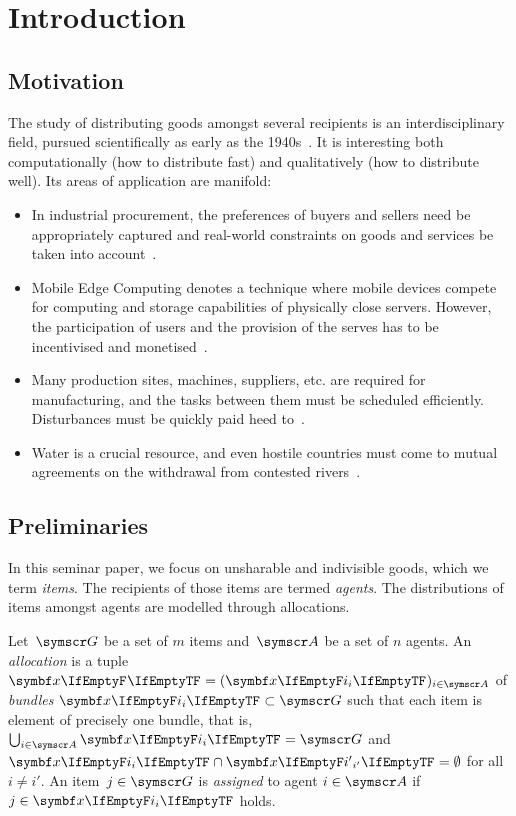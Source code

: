 \section{Introduction}
\label{sec:intro}

\subsection{Motivation}
\label{subsec:intro:motivation}

The study of distributing goods amongst several recipients is an interdisciplinary field, pursued scientifically as early as the 1940s~\cite{the_problem_of_fair_division}.
It is interesting both computationally (how to distribute fast) and qualitatively (how to distribute well).
Its areas of application are manifold:
\begin{itemize}
	\item
	In industrial procurement, the preferences of buyers and sellers need be appropriately captured and real-world constraints on goods and services be taken into account~\cite{survey}.

	\item
	Mobile Edge Computing denotes a technique where mobile devices compete for computing and storage capabilities of physically close servers.
	However, the participation of users and the provision of the serves has to be incentivised and monetised~\cite{edge_computing_auction, edge_computing_report}.

	\item
	Many production sites, machines, suppliers, etc. are required for manufacturing, and the tasks between them must be scheduled efficiently.
	Disturbances must be quickly paid heed to~\cite{survey}.

	\item
	Water is a crucial resource, and even hostile countries must come to mutual agreements on the withdrawal from contested rivers~\cite{water_management}.
\end{itemize}


\subsection{Preliminaries}
\label{subsec:intro:prelim}

In this seminar paper, we focus on unsharable and indivisible goods, which we term \emph{items}.
The recipients of those items are termed \emph{agents}.
The distributions of items amongst agents are modelled through allocations.
\begin{definition}
	Let~\(\goods\) be a set of \(m\) items and~\(\agents\) be a set of \(n\) agents.
	An \emph{allocation} is a tuple \(\alloc[][] = (\alloc)_{i \in \agents}\) of \emph{bundles} \(\alloc \subset \goods\) such that each item is element of precisely one bundle, that is, \(\bigcup_{i \in \agents} \alloc = \goods\) and \(\alloc \cap \alloc[][i'] = \emptyset\) for all \(i \neq i'\).
	An item~\(j \in \goods\) is \emph{assigned} to agent \(i \in \agents\) if \(j \in \alloc\) holds.
\end{definition}

